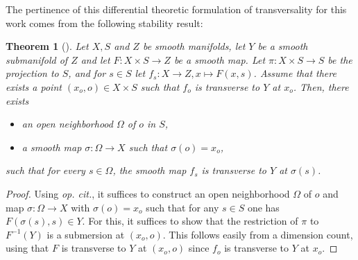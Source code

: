 \documentclass[10pt]{article}
\numberwithin{equation}{subsection}
\theoremstyle{plain}
\newtheorem{theorem}{Theorem}[section]
\theoremstyle{definition}
\theoremstyle{remark}
\begin{document}
%
The pertinence of this differential theoretic formulation of transversality for this work comes from the following stability result:
\begin{theorem}[{\cite[Chap. 1,\S 6, Stability Theorem]{pollguill}}]\label{stabtrans}
Let $X,S$ and $Z$ be smooth manifolds, let $Y$ be a smooth submanifold of $Z$ and let $F : X \times S \rightarrow Z$ be a smooth map. Let $\pi : X \times S \rightarrow S$ be the projection to $S$, and for $s \in S$ let $f_s : X \rightarrow Z, x \mapsto F(x,s)$. Assume that there exists a point $(x_o,o) \in X \times S$ such that $f_o$ is transverse to $Y$ at $x_o$. Then, there exists
\begin{itemize}
\item[(i)] an open neighborhood $\Omega$ of $o$ in $S$,
\item[(ii)] a smooth map $\sigma : \Omega \rightarrow X$ such that $\sigma(o) = x_o$,
\end{itemize}
such that for every $s \in \Omega$, the smooth map $f_s$ is transverse to $Y$ at $\sigma(s)$.
\end{theorem}
\begin{proof}
Using \textit{op. cit.}, it suffices to construct an open neighborhood $\Omega$ of $o$ and map $\sigma : \Omega \rightarrow X$ with $\sigma(o) = x_o$ such that for any $s \in S$ one has $F(\sigma(s),s) \in Y$. For this, it suffices to show that the restriction of $\pi$ to $F^{-1}(Y)$ is a submersion at $(x_o,o)$. This follows easily from a dimension count, using that $F$ is transverse to $Y$ at $(x_o,o)$ since $f_o$ is transverse to $Y$ at $x_o$.
\end{proof}
\end{document}
